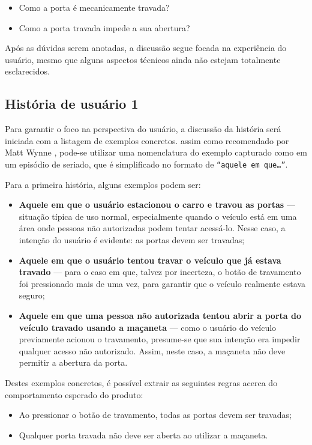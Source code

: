 \begin{itemize}
    \item Como a porta é mecanicamente travada?
    \item Como a porta travada impede a sua abertura?
\end{itemize}

Após as dúvidas serem anotadas, a discussão segue focada na experiência do usuário, mesmo que alguns aspectos técnicos ainda não estejam totalmente esclarecidos.

\subsection{História de usuário 1}
Para garantir o foco na perspectiva do usuário, a discussão da história será iniciada com a listagem de exemplos concretos. assim como recomendado por 
Matt Wynne \cite{cucumberExampleMapping}, pode-se utilizar uma nomenclatura do exemplo capturado como em um episódio de seriado, que é simplificado 
no formato de \texttt{“aquele em que…”}.

Para a primeira história, alguns exemplos podem ser:

\begin{itemize}
    \item \textbf{Aquele em que o usuário estacionou o carro e travou as portas} — situação típica de uso normal, especialmente quando o veículo está em uma área onde pessoas não autorizadas podem tentar acessá-lo. Nesse caso, a intenção do usuário é evidente: as portas devem ser travadas;
    \item \textbf{Aquele em que o usuário tentou travar o veículo que já estava travado} — para o caso em que, talvez por incerteza, o botão de travamento foi pressionado mais de uma vez, para garantir que o veículo realmente estava seguro;
    \item \textbf{Aquele em que uma pessoa não autorizada tentou abrir a porta do veículo travado usando a maçaneta} — como o usuário do veículo previamente acionou o travamento, presume-se que sua intenção era impedir qualquer acesso não autorizado. Assim, neste caso, a maçaneta não deve permitir a abertura da porta.
\end{itemize}

Destes exemplos concretos, é possível extrair as seguintes regras acerca do comportamento esperado do produto:

\begin{itemize}
    \item Ao pressionar o botão de travamento, todas as portas devem ser travadas;
    \item Qualquer porta travada não deve ser aberta ao utilizar a maçaneta.
\end{itemize}

